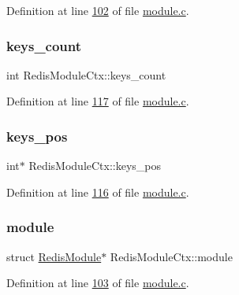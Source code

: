 Definition at line \hyperlink{module_8c_source_l00102}{102} of file \hyperlink{module_8c_source}{module.\+c}.

\mbox{\label{structRedisModuleCtx_af3c83f9432f03ffb9bb262ffe42ea5ca}} 
\subsubsection{\texorpdfstring{keys\+\_\+count}{keys\_count}}
{\footnotesize\ttfamily int Redis\+Module\+Ctx\+::keys\+\_\+count}



Definition at line \hyperlink{module_8c_source_l00117}{117} of file \hyperlink{module_8c_source}{module.\+c}.

\mbox{\label{structRedisModuleCtx_a04e22a461cb7780739e9809565192265}} 
\subsubsection{\texorpdfstring{keys\+\_\+pos}{keys\_pos}}
{\footnotesize\ttfamily int$\ast$ Redis\+Module\+Ctx\+::keys\+\_\+pos}



Definition at line \hyperlink{module_8c_source_l00116}{116} of file \hyperlink{module_8c_source}{module.\+c}.

\mbox{\label{structRedisModuleCtx_a5c03066457fbd2c83b4cbc7e40d8f01f}} 
\subsubsection{\texorpdfstring{module}{module}}
{\footnotesize\ttfamily struct \hyperlink{structRedisModule}{Redis\+Module}$\ast$ Redis\+Module\+Ctx\+::module}



Definition at line \hyperlink{module_8c_source_l00103}{103} of file \hyperlink{module_8c_source}{module.\+c}.

